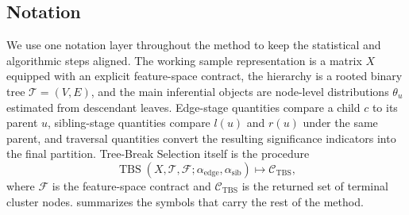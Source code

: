 
\subsection{Notation}

We use one notation layer throughout the method to keep the statistical and
algorithmic steps aligned. The working sample representation is a matrix $X$
equipped with an explicit feature-space contract, the hierarchy is a rooted
binary tree $\mathcal{T} = (V,E)$, and the main inferential objects are
node-level distributions $\theta_u$ estimated from descendant leaves. Edge-stage
quantities compare a child $c$ to its parent $u$, sibling-stage quantities
compare $l(u)$ and $r(u)$ under the same parent, and traversal quantities
convert the resulting significance indicators into the final partition.
Tree-Break Selection itself is the procedure
\[
\operatorname{TBS}(X,\mathcal T,\mathcal F;
\alpha_{\mathrm{edge}},\alpha_{\mathrm{sib}})
\longmapsto
\mathcal C_{\mathrm{TBS}},
\]
where \(\mathcal F\) is the feature-space contract and
\(\mathcal C_{\mathrm{TBS}}\) is the returned set of terminal cluster nodes.
 summarizes the symbols that carry the rest of the method.

